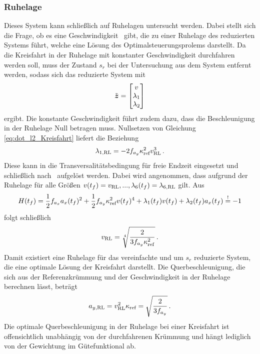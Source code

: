 \subsubsection{Ruhelage}\label{subsubsec:RL_ohne_Querdynamik}
Dieses System kann schließlich auf Ruhelagen untersucht werden. Dabei stellt sich die Frage, ob es eine Geschwindigkeit \vRL~gibt, die zu einer Ruhelage des reduzierten Systems führt, welche eine Lösung des Optimalsteuerungsprolems darstellt. Da die Kreisfahrt in der Ruhelage mit konstanter Geschwindigkeit durchfahren werden soll, muss der Zustand $s_r$ bei der Untersuchung aus dem System entfernt werden, sodass sich das reduzierte System mit 
\begin{equation}
\tilde{\boldsymbol{z}} = \begin{bmatrix}
v \\
\lambda_1 \\
\lambda_2
\end{bmatrix}
\end{equation}
ergibt. Die konstante Geschwindigkeit führt zudem dazu, dass die Beschleunigung in der Ruhelage Null betragen muss. Nullsetzen von Gleichung \eqref{eq:dot_l2_Kreisfahrt} liefert die Beziehung 
\begin{equation}
\lambda_{1,\textrm{RL}} = -2f_{a_y}\kappa_{\textrm{ref}}^2v_{\textrm{RL}}^3\,.
\end{equation}
Diese kann in die Transversalitätsbedingung für freie Endzeit eingesetzt und schließlich nach \vRL~aufgelöst werden. Dabei wird angenommen, dass aufgrund der Ruhelage für alle Größen $v(t_f) = v_{\textrm{RL}},...,\lambda_6(t_f) = \lambda_{6,\textrm{RL}}$ gilt. Aus 
\begin{equation}
H(t_f) = \frac{1}{2}f_{a_x} a_x(t_f)^2 + \frac{1}{2}f_{a_y} \kappa_{\textrm{ref}}^2v(t_f)^4 + \lambda_1(t_f)v(t_f) + \lambda_2(t_f)a_x(t_f) \stackrel{!}{=} -1 
\end{equation}
folgt schließlich
\begin{equation}
v_{\textrm{RL}} = \sqrt[4]{\frac{2}{3f_{a_y}\kappa_{\textrm{ref}}^2}} \,. \label{eq:v_RL_ohne_Qerdynamik}
\end{equation}
Damit existiert eine Ruhelage für das vereinfachte und um $s_r$ reduzierte System, die eine optimale Lösung der Kreisfahrt darstellt. Die Querbeschleunigung, die sich aus der Referenzkrümmung und der Geschwindigkeit in der Ruhelage berechnen lässt, beträgt
\begin{equation}
a_{y,\textrm{RL}} = v_{\textrm{RL}}^2\kappa_{\textrm{ref}} = \sqrt{\frac{2}{3f_{a_y}}} \,. \label{eq:ayRL_Kreisfahrt}
\end{equation}
Die optimale Querbeschleunigung in der Ruhelage bei einer Kreisfahrt ist offensichtlich unabhängig von der durchfahrenen Krümmung und hängt lediglich von der Gewichtung im Gütefunktional ab.
